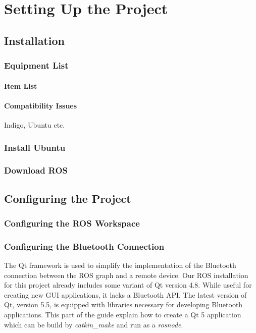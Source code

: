 \chapter{Setting Up the Project}

\section{Installation}

\subsection{Equipment List}

\subsubsection{Item List}

\subsubsection{Compatibility Issues}

Indigo, Ubuntu etc.

\subsection{Install Ubuntu}

\subsection{Download ROS}

\section{Configuring the Project}

\subsection{Configuring the ROS Workspace}

\subsection{Configuring the Bluetooth Connection}

The Qt framework is used to simplify the implementation of the Bluetooth connection between the \ac{ROS} graph and a remote device. Our \ac{ROS} installation for this project already includes some variant of Qt version 4.8. While useful for creating new \ac{GUI} applications, it lacks a Bluetooth API. The latest version of Qt, version 5.5, is equipped with libraries necessary for developing Bluetooth applications. This part of the guide explain how to create a Qt 5 application which can be build by \textit{catkin\_make} and run as a \textit{rosnode}.
